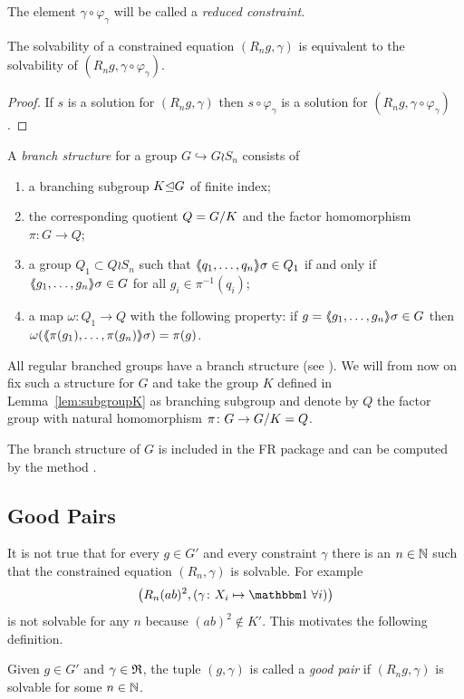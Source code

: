 \documentclass[a4paper,11pt]{amsart}
\begin{document}
 The element $\gamma \circ \varphi_\gamma$ will be called a \emph{reduced constraint}.

\begin{lem} \label{lem:solvabilityWithReducedConstraint}
 The solvability of a constrained equation $(R_n g,\gamma)$ is equivalent to the 
 solvability of $(R_n g,\gamma\circ \varphi_\gamma)$.
\end{lem}
 \begin{proof}
 If $s$ is a solution for $(R_n g,\gamma)$ then $s\circ \varphi_\gamma$ is
 a solution for $(R_n g,\gamma\circ \varphi_\gamma)$. 
\end{proof}


\begin{defi} 
A \emph{branch structure} for a group $G\hookrightarrow G \wr S_n$ consists of  
\begin{enumerate}
 \item a branching subgroup $K{\mathrel\trianglelefteq} G$ of finite index;
 \item the corresponding quotient $Q={G/K}$ and the factor homomorphism $\pi\colon G \to Q$;
 \item a group $Q_1 \subset Q \wr S_n$ such that $\langle\negthickspace\langle q_1,\ldots,q_n\rangle\negthickspace\rangle\sigma\in Q_1$ if
  and only if $\langle\negthickspace\langle g_1,\ldots,g_n\rangle\negthickspace\rangle\sigma \in G$ for all $g_i \in \pi^{-1}(q_i)$;
 \item a map $\omega\colon Q_1 \to Q$ with the following property: if 
      $g=\langle\negthickspace\langle g_1,\ldots,g_n\rangle\negthickspace\rangle\sigma \in G$ then $\omega(\langle\negthickspace\langle\pi(g_1),\ldots,\pi(g_n)\rangle\negthickspace\rangle\sigma) = \pi(g)$.
\end{enumerate}
\end{defi}
All regular branched groups have a branch structure
(see {\cite[Remark after Definition~5.1]{Bartholdi:RepresentationZetaFunctions}}).
We will from now on fix such a structure for $G$ and take 
the group $K$ defined in Lemma~\ref{lem:subgroupK} as branching subgroup and 
denote by $Q$ the factor group with natural homomorphism $\pi\colon G \to {G/K}=Q$.

\begin{re}
  The branch structure of $G$ is included in the FR package and can be
  computed by the method .
\end{re}

\subsection{Good Pairs}\label{sec:good_pairs}
It is not true that for every $g\in G'$ and every constraint $\gamma$
there is an $n\in\mathbb{N}$ such that the constrained equation
$(R_n,\gamma)$ is solvable. For example
\[\left(R_n(ab)^2,(\gamma\colon X_i\mapsto\id\;\forall i)\right)\] 
is not solvable for any $n$ because $(ab)^2\notin K'$.  This motivates
the following definition.
\begin{defi}
Given $g\in G'$ and $\gamma\in\mathfrak{R}$, the tuple $(g,\gamma)$ is called a \emph{good pair} if 
$(R_ng,\gamma)$ is solvable for some $n\in\mathbb{N}$.  
\end{defi}
\end{document}
